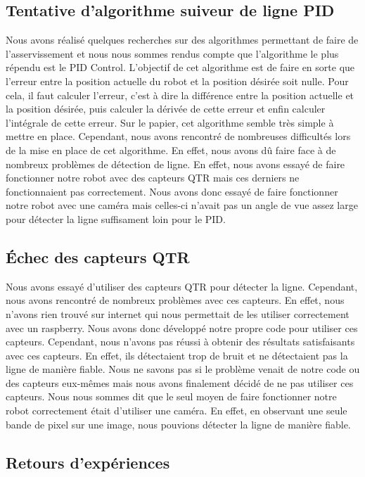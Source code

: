 \documentclass[a4paper, 12pt]{report}
\begin{document}
\subsection{Tentative d'algorithme suiveur de ligne PID}
Nous avons réalisé quelques recherches sur des algorithmes permettant de faire de l'asservissement et nous nous sommes rendus compte que l'algorithme le plus répendu est le PID Control.
L'objectif de cet algorithme est de faire en sorte que l'erreur entre la position actuelle du robot et la position désirée soit nulle. Pour cela, il faut calculer l'erreur, c'est à dire la différence entre la position actuelle et la position désirée, puis calculer la dérivée de cette erreur et enfin calculer l'intégrale de cette erreur.
Sur le papier, cet algorithme semble très simple à mettre en place. Cependant, nous avons rencontré de nombreuses difficultés lors de la mise en place de cet algorithme.
En effet, nous avons dû faire face à de nombreux problèmes de détection de ligne. En effet, nous avons essayé de faire fonctionner notre robot avec des capteurs QTR mais ces derniers ne fonctionnaient pas correctement. Nous avons donc essayé de faire fonctionner notre robot avec une caméra mais celles-ci n'avait pas un angle de vue assez large pour détecter la ligne suffisament loin pour le PID.

\subsection{Échec des capteurs QTR}
Nous avons essayé d'utiliser des capteurs QTR pour détecter la ligne. Cependant, nous avons rencontré de nombreux problèmes avec ces capteurs. En effet, nous n'avons rien trouvé sur internet qui nous permettait de les utiliser correctement avec un raspberry.
Nous avons donc développé notre propre code pour utiliser ces capteurs. Cependant, nous n'avons pas réussi à obtenir des résultats satisfaisants avec ces capteurs. En effet, ils détectaient trop de bruit et ne détectaient pas la ligne de manière fiable.
Nous ne savons pas si le problème venait de notre code ou des capteurs eux-mêmes mais nous avons finalement décidé de ne pas utiliser ces capteurs.
Nous nous sommes dit que le seul moyen de faire fonctionner notre robot correctement était d'utiliser une caméra. En effet, en observant une seule bande de pixel sur une image, nous pouvions détecter la ligne de manière fiable.


\subsection{Retours d'expériences}
\end{document}
